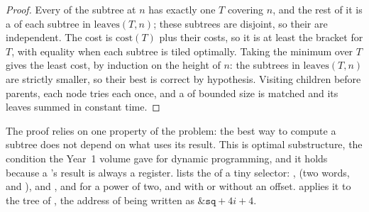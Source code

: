 \begin{proof}
Every  of the subtree at $n$ has exactly one  $T$ covering $n$, and the rest of it is a  of each subtree in $\mathrm{leaves}(T, n)$; these subtrees are disjoint, so their  are independent. The cost is $\mathrm{cost}(T)$ plus their costs, so it is at least the bracket for $T$, with equality when each subtree is tiled optimally. Taking the minimum over $T$ gives the least cost, by induction on the height of $n$: the subtrees in $\mathrm{leaves}(T, n)$ are strictly smaller, so their $\mathrm{best}$ is correct by hypothesis. Visiting children before parents, each node tries each  once, and a  of bounded size is matched and its leaves summed in constant time.
\end{proof}

The proof relies on one property of the problem: the best way to compute a subtree does not depend on what uses its result. This is optimal substructure, the condition the Year~1 volume gave for dynamic programming, and it holds because a 's result is always a register.  lists the  of a tiny selector: ,  (two words,  and ),  and ,  and  for a power of two, and  with or without an offset.  applies it to the tree of , the address of  being written as $\&\mathtt{sq} + 4i + 4$.

\label{lst:b3:code-generation:tiles}

\label{lst:b3:code-generation:best}

\label{out:b3:code-generation:tiling}

